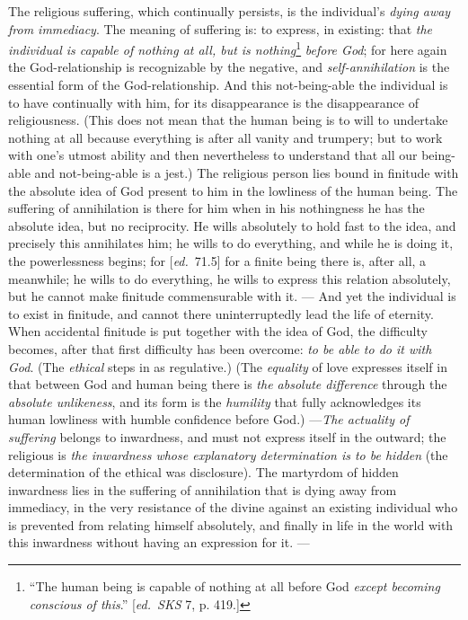 \documentclass[12pt,a4paper,openany]{book}
\newcommand{\kpage}[1]{\marginnote{\footnotesize\textit{[#1]}}}
\newcommand{\ed}[1]{{\small[\textit{ed.}\ #1]}}
\begin{document}
The religious suffering, which continually persists, is the individual's \emph{dying away
from immediacy}. The meaning of suffering is: to express, in existing:
that \emph{the individual is capable of nothing at all, but is nothing}\footnote[74]{``The human being is capable of nothing at all before God \emph{except becoming conscious of this}.'' \ed{\emph{SKS} 7, p. 419.}}
\emph{before God}; for here again
the God-relationship is recognizable by the negative, and \emph{self-annihilation}
is the essential form of the God-relationship.
And this not-being-able
the individual is to have continually with him, for its disappearance is the disappearance
of religiousness. (This does not mean that the human being is to will
to undertake nothing at all because everything is after all vanity and
trumpery; but to work with one's utmost ability and then nevertheless to understand that all our
being-able and not-being-able is a jest.) The religious person lies bound
in finitude with the absolute idea of God present to him in
the lowliness of the human being. The suffering of annihilation is there for him when
in his nothingness he has the absolute idea, but no reciprocity.
He wills absolutely to hold fast to the idea, and precisely this annihilates
him; he wills to do everything, and while he is doing it, the powerlessness
begins; for \ed{71.5} for a finite being there is, after all, a meanwhile; he wills
to do everything, he wills to express this relation absolutely, but he cannot
make finitude commensurable with it. --- And yet the individual is to
exist in finitude, and cannot there uninterruptedly lead the life of
eternity. When accidental finitude is put together with the idea of God,
the difficulty becomes, after that first difficulty
has been overcome: \emph{to be able to do it with God}. (The \emph{ethical} steps in
as regulative.) (The \emph{equality} of love expresses itself in that between God and
human being there is \emph{the absolute difference} through the \emph{absolute unlikeness}, and
its form is the \emph{humility} that fully acknowledges its human
lowliness with humble confidence before God.) ---\emph{The actuality of suffering}
belongs to inwardness, and must not express itself in the outward; the
religious is \emph{the inwardness whose explanatory determination is to be hidden}
(the determination of the ethical was disclosure). The martyrdom of hidden
inwardness lies in the suffering of annihilation that is dying away
from immediacy, in the very resistance of the divine
\kpage{143}against an existing individual who is prevented from relating himself absolutely, and finally
in life in the world with this inwardness without having an expression
for it. ---
\end{document}
